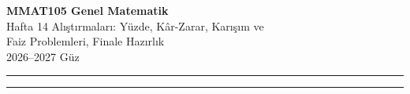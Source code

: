 \documentclass[11pt,a4paper]{article}
\newcounter{alis}
\begin{document}
\begin{minipage}[c]{\textwidth}
{\LARGE\bfseries\color{anamavi} MMAT105 Genel Matematik}\\[4pt]
{\large Hafta 14 Alıştırmaları: Yüzde, Kâr-Zarar, Karışım ve\\ Faiz Problemleri, Finale Hazırlık}\\[6pt]
{\small 2026--2027 Güz}
\end{minipage}

\vspace{4pt}\noindent\textcolor{anamavi}{\rule{\textwidth}{1pt}}



\vspace{6pt}
\noindent\textcolor{anamavi}{\rule{\textwidth}{0.5pt}}\\
{\small }
\end{document}
